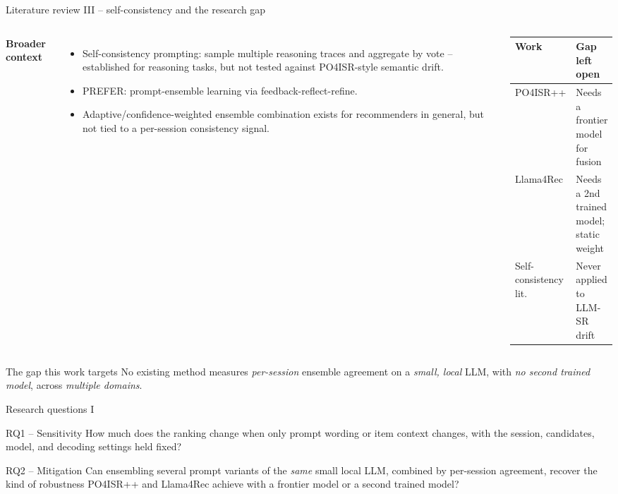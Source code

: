 \documentclass[aspectratio=169,12pt]{beamer}
\begin{document}
\begin{frame}{Literature review III -- self-consistency and the research gap}
\begin{columns}[T]
\textbf{Broader context}
\begin{itemize}
  \item Self-consistency prompting: sample multiple reasoning traces and
        aggregate by vote -- established for reasoning tasks, but not
        tested against PO4ISR-style semantic drift.
  \item PREFER: prompt-ensemble learning via feedback-reflect-refine.
  \item Adaptive/confidence-weighted ensemble combination exists for
        recommenders in general, but not tied to a per-session consistency
        signal.
\end{itemize}

\small
\begin{tabularx}{\linewidth}{@{}p{0.30\linewidth}X@{}}
\toprule
\textbf{Work} & \textbf{Gap left open}\\
\midrule
PO4ISR++ & Needs a frontier model for fusion\\
Llama4Rec & Needs a 2nd trained model; static weight\\
Self-consistency lit. & Never applied to LLM-SR drift\\
\bottomrule
\end{tabularx}
\end{columns}

\vspace{0.6em}
\begin{alertblock}{The gap this work targets}
No existing method measures \emph{per-session} ensemble agreement on a
\emph{small, local} LLM, with \emph{no second trained model}, across
\emph{multiple domains}.
\end{alertblock}
\end{frame}

\begin{frame}{Research questions I}
\begin{block}{RQ1 -- Sensitivity}
How much does the ranking change when only prompt wording or item context
changes, with the session, candidates, model, and decoding settings held
fixed?
\end{block}

\vspace{0.8em}
\begin{block}{RQ2 -- Mitigation}
Can ensembling several prompt variants of the \emph{same} small local LLM,
combined by per-session agreement, recover the kind of robustness PO4ISR++
and Llama4Rec achieve with a frontier model or a second trained model?
\end{block}
\end{frame}
\end{document}
